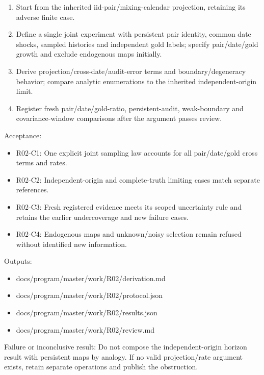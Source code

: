 \documentclass[
  11pt,
  a4paper,
]{article}
\providecommand{\tightlist}{%
  \setlength{\itemsep}{0pt}\setlength{\parskip}{0pt}}
\begin{document}
\begin{enumerate}
\def\labelenumi{\arabic{enumi}.}
\tightlist
\item
  Start from the inherited iid-pair/mixing-calendar projection,
  retaining its adverse finite case.
\item
  Define a single joint experiment with persistent pair identity, common
  date shocks, sampled histories and independent gold labels; specify
  pair/date/gold growth and exclude endogenous maps initially.
\item
  Derive projection/cross-date/audit-error terms and boundary/degeneracy
  behavior; compare analytic enumerations to the inherited
  independent-origin limit.
\item
  Register fresh pair/date/gold-ratio, persistent-audit, weak-boundary
  and covariance-window comparisons after the argument passes review.
\end{enumerate}

Acceptance:

\begin{itemize}
\tightlist
\item
  R02-C1: One explicit joint sampling law accounts for all
  pair/date/gold cross terms and rates.
\item
  R02-C2: Independent-origin and complete-truth limiting cases match
  separate references.
\item
  R02-C3: Fresh registered evidence meets its scoped uncertainty rule
  and retains the earlier undercoverage and new failure cases.
\item
  R02-C4: Endogenous maps and unknown/noisy selection remain refused
  without identified new information.
\end{itemize}

Outputs:

\begin{itemize}
\tightlist
\item
  docs/program/master/work/R02/derivation.md
\item
  docs/program/master/work/R02/protocol.json
\item
  docs/program/master/work/R02/results.json
\item
  docs/program/master/work/R02/review.md
\end{itemize}

Failure or inconclusive result: Do not compose the independent-origin
horizon result with persistent maps by analogy. If no valid
projection/rate argument exists, retain separate operations and publish
the obstruction.
\end{document}
